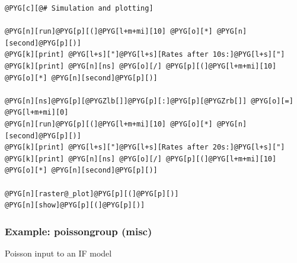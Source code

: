 \documentclass[letterpaper,10pt,english]{manual}
\begin{document}
\begin{Verbatim}[commandchars=@\[\]]
@PYG[c][@# Simulation and plotting]

@PYG[n][run]@PYG[p][(]@PYG[l+m+mi][10] @PYG[o][*] @PYG[n][second]@PYG[p][)]
@PYG[k][print] @PYG[l+s]["]@PYG[l+s][Rates after 10s:]@PYG[l+s]["]
@PYG[k][print] @PYG[n][ns] @PYG[o][/] @PYG[p][(]@PYG[l+m+mi][10] @PYG[o][*] @PYG[n][second]@PYG[p][)]

@PYG[n][ns]@PYG[p][@PYGZlb[]]@PYG[p][:]@PYG[p][@PYGZrb[]] @PYG[o][=] @PYG[l+m+mi][0]
@PYG[n][run]@PYG[p][(]@PYG[l+m+mi][10] @PYG[o][*] @PYG[n][second]@PYG[p][)]
@PYG[k][print] @PYG[l+s]["]@PYG[l+s][Rates after 20s:]@PYG[l+s]["]
@PYG[k][print] @PYG[n][ns] @PYG[o][/] @PYG[p][(]@PYG[l+m+mi][10] @PYG[o][*] @PYG[n][second]@PYG[p][)]

@PYG[n][raster@_plot]@PYG[p][(]@PYG[p][)]
@PYG[n][show]@PYG[p][(]@PYG[p][)]
\end{Verbatim}

\resetcurrentobjects
\hypertarget{--doc-examples-misc_poissongroup}{}

\hypertarget{index-60}{}\subsubsection{Example: poissongroup (misc)}

Poisson input to an IF model
\end{document}
